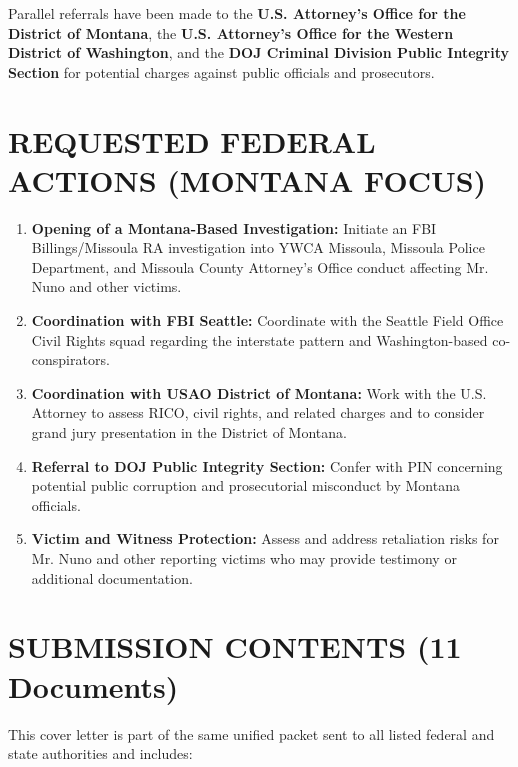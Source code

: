 \documentclass[12pt,oneside]{article}
\begin{document}
\begin{flushleft}
Parallel referrals have been made to the \textbf{U.S. Attorney's Office for the District of Montana}, the \textbf{U.S. Attorney's Office for the Western District of Washington}, and the \textbf{DOJ Criminal Division Public Integrity Section} for potential charges against public officials and prosecutors.

\section*{REQUESTED FEDERAL ACTIONS (MONTANA FOCUS)}

\begin{enumerate}
\item \textbf{Opening of a Montana-Based Investigation:} Initiate an FBI Billings/Missoula RA investigation into YWCA Missoula, Missoula Police Department, and Missoula County Attorney's Office conduct affecting Mr. Nuno and other victims.
\item \textbf{Coordination with FBI Seattle:} Coordinate with the Seattle Field Office Civil Rights squad regarding the interstate pattern and Washington-based co-conspirators.
\item \textbf{Coordination with USAO District of Montana:} Work with the U.S. Attorney to assess RICO, civil rights, and related charges and to consider grand jury presentation in the District of Montana.
\item \textbf{Referral to DOJ Public Integrity Section:} Confer with PIN concerning potential public corruption and prosecutorial misconduct by Montana officials.
\item \textbf{Victim and Witness Protection:} Assess and address retaliation risks for Mr. Nuno and other reporting victims who may provide testimony or additional documentation.
\end{enumerate}

\section*{SUBMISSION CONTENTS (11 Documents)}

This cover letter is part of the same unified packet sent to all listed federal and state authorities and includes:


\end{flushleft}
\end{document}
